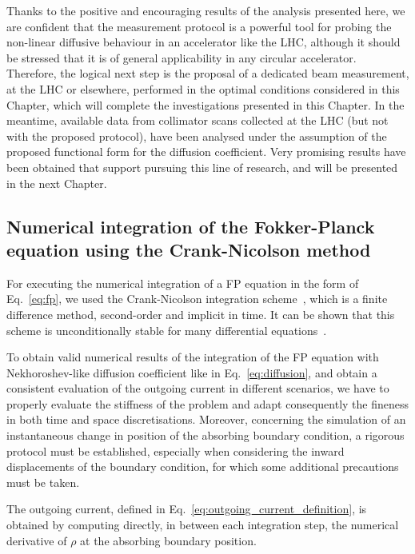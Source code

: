 {Thanks to the positive and encouraging results of the analysis presented here, we are confident that the measurement protocol is a powerful tool for probing the non-linear diffusive behaviour in an accelerator like the LHC, although it should be stressed that it is of general applicability in any circular accelerator. Therefore, the logical next step is the proposal of a dedicated beam measurement, at the LHC or elsewhere, performed in the optimal conditions considered in this Chapter, which will complete the investigations presented in this Chapter. In the meantime, available data from collimator scans collected at the LHC (but not with the proposed protocol), have been analysed under the assumption of the proposed functional form for the diffusion coefficient. Very promising results have been obtained that support pursuing this line of research, and will be presented in the next Chapter.

\begin{chapterappendices}
\section{Numerical integration of the Fokker-Planck equation using the Crank-Nicolson method} \label{app_sec:numerical_integration_with_crank_nicolson}


For executing the numerical integration of a FP equation in the form of Eq.~\eqref{eq:fp}, we used the Crank-Nicolson integration scheme~\cite{crank1947practical}, which is a finite difference method, second-order and implicit in time. It can be shown that this scheme is unconditionally stable for many differential equations~\cite{thomas2013numerical}.

To obtain valid numerical results of the integration of the FP equation with Nekhoroshev-like diffusion coefficient like in Eq.~\eqref{eq:diffusion}, and obtain a consistent evaluation of the outgoing current in different scenarios, we have to properly evaluate the stiffness of the problem and adapt consequently the fineness in both time and space discretisations. Moreover, concerning the simulation of an instantaneous change in position of the absorbing boundary condition, a rigorous protocol must be established, especially when considering the inward displacements of the boundary condition, for which some additional precautions must be taken.

The outgoing current, defined in Eq.~\eqref{eq:outgoing_current_definition}, is obtained by computing directly, in between each integration step, the numerical derivative of $\rho$ at the absorbing boundary position. 


\end{chapterappendices}}
